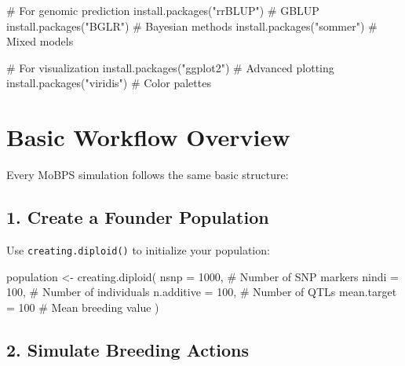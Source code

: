 \documentclass[
  letterpaper,
]{book}
\newenvironment{Shaded}{\begin{snugshade}}{\end{snugshade}}
\newcommand{\AttributeTok}[1]{\textcolor[rgb]{0.40,0.45,0.13}{#1}}
\newcommand{\CommentTok}[1]{\textcolor[rgb]{0.37,0.37,0.37}{#1}}
\newcommand{\DecValTok}[1]{\textcolor[rgb]{0.68,0.00,0.00}{#1}}
\newcommand{\FunctionTok}[1]{\textcolor[rgb]{0.28,0.35,0.67}{#1}}
\newcommand{\NormalTok}[1]{\textcolor[rgb]{0.00,0.23,0.31}{#1}}
\newcommand{\OtherTok}[1]{\textcolor[rgb]{0.00,0.23,0.31}{#1}}
\newcommand{\StringTok}[1]{\textcolor[rgb]{0.13,0.47,0.30}{#1}}
\begin{document}
\begin{Shaded}
\begin{Highlighting}[]
\CommentTok{\# For genomic prediction}
\FunctionTok{install.packages}\NormalTok{(}\StringTok{"rrBLUP"}\NormalTok{)    }\CommentTok{\# GBLUP}
\FunctionTok{install.packages}\NormalTok{(}\StringTok{"BGLR"}\NormalTok{)      }\CommentTok{\# Bayesian methods}
\FunctionTok{install.packages}\NormalTok{(}\StringTok{"sommer"}\NormalTok{)    }\CommentTok{\# Mixed models}

\CommentTok{\# For visualization}
\FunctionTok{install.packages}\NormalTok{(}\StringTok{"ggplot2"}\NormalTok{)   }\CommentTok{\# Advanced plotting}
\FunctionTok{install.packages}\NormalTok{(}\StringTok{"viridis"}\NormalTok{)   }\CommentTok{\# Color palettes}
\end{Highlighting}
\end{Shaded}

\section{Basic Workflow Overview}\label{sec-workflow}

Every MoBPS simulation follows the same basic structure:

\subsection{1. Create a Founder
Population}\label{create-a-founder-population}

Use \texttt{creating.diploid()} to initialize your population:

\begin{Shaded}
\begin{Highlighting}[]
\NormalTok{population }\OtherTok{\textless{}{-}} \FunctionTok{creating.diploid}\NormalTok{(}
  \AttributeTok{nsnp =} \DecValTok{1000}\NormalTok{,          }\CommentTok{\# Number of SNP markers}
  \AttributeTok{nindi =} \DecValTok{100}\NormalTok{,          }\CommentTok{\# Number of individuals}
  \AttributeTok{n.additive =} \DecValTok{100}\NormalTok{,     }\CommentTok{\# Number of QTLs}
  \AttributeTok{mean.target =} \DecValTok{100}     \CommentTok{\# Mean breeding value}
\NormalTok{)}
\end{Highlighting}
\end{Shaded}

\subsection{2. Simulate Breeding
Actions}\label{simulate-breeding-actions}
\end{document}
